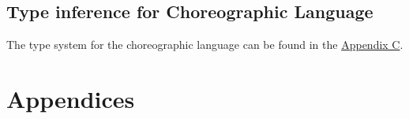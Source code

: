 \documentclass{article}
\begin{document}
\subsection{Type inference for Choreographic Language}
    The type system for the choreographic language can be found in the \hyperref[appendix:choreo_typ]{Appendix C}.

    \newpage %

\section{Appendices}
    \begin{appendices}
        \renewcommand{\thesubsection}{Appendix \Alph{subsection}}


\end{appendices}
\end{document}
